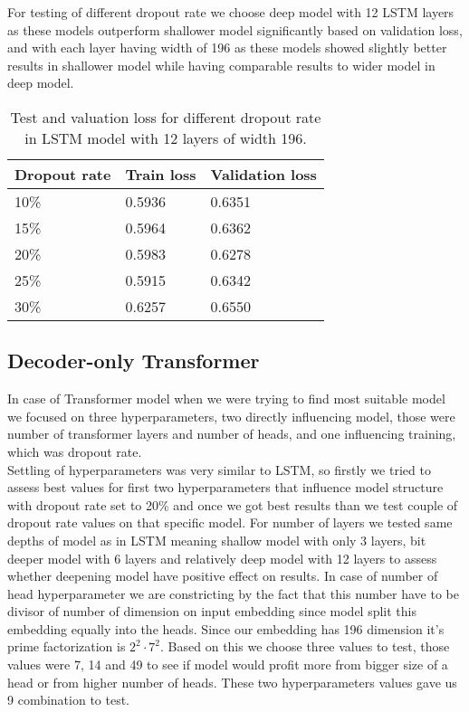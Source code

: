 For testing of different dropout rate we choose deep model with 12 LSTM layers as these models outperform shallower model significantly based on validation loss, and with each layer having width of 196 as these models showed slightly better results in shallower model while having comparable results to wider model in deep model.

\begin{table}[]
	\centering
	\begin{tabular}{|l|l|l|}
		\hline
		Dropout rate & Train loss & Validation loss \\ \hline
		10\%         & 0.5936    & 0.6351                \\ \hline
		15\%         & 0.5964    & 0.6362                \\ \hline
		20\%         & 0.5983    & 0.6278                \\ \hline
		25\%         & 0.5915    & 0.6342                \\ \hline
		30\%         & 0.6257    & 0.6550                \\ \hline 
	\end{tabular}
	\caption{Test and valuation loss for different dropout rate in LSTM model with 12 layers of width 196.}
	\label{tab:lstm_dropout}
\end{table}

\subsection{Decoder-only Transformer}

In case of Transformer model when we were trying to find most suitable model we focused on three hyperparameters, two directly influencing model, those were number of transformer layers and number of heads, and one influencing training, which was dropout rate.
\\

Settling of hyperparameters was very similar to LSTM, so firstly we tried to assess best values for first two hyperparameters that influence model structure with dropout rate set to 20\% and once we got best results than we test couple of dropout rate values on that specific model. For number of layers we tested same depths of model as in LSTM meaning shallow model with only 3 layers, bit deeper model with 6 layers and relatively deep model with 12 layers to assess whether deepening model have positive effect on results. In case of number of head hyperparameter we are constricting by the fact that this number have to be divisor of number of dimension on input embedding since model split this embedding equally into the heads. Since our embedding has 196 dimension it's prime factorization is $2^2\cdot7^2$. Based on this we choose three values to test, those values were 7, 14 and 49 to see if model would profit more from bigger size of a head  or from higher number of heads. These two hyperparameters values gave us 9 combination to test.

